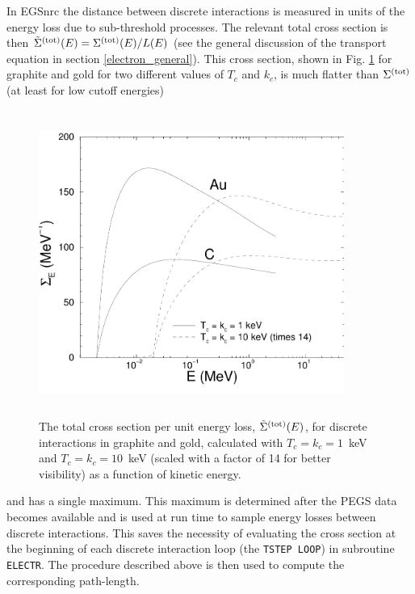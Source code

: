 In EGSnrc the distance between discrete interactions is measured 
in units of the energy loss due to sub-threshold processes. 
The relevant total cross section is then 
$\tilde{\Sigma}^{\rm (tot)}(E) = \Sigma^{\rm (tot)}(E)/L(E)$ 
(see the general discussion 
of the transport equation in section \ref{electron_general}).
This cross section, shown in Fig. \ref{tilde_sigma} for graphite and gold 
for two different values of $T_c$ and $k_c$, 
is much flatter than $\Sigma^{\rm (tot)}$ 
(at least for low cutoff energies) 
\begin{figure}[htp]
\includegraphics[height=10cm,width=10cm]{figures/cse_all}
\caption[Total cross sections per unit energy loss]{\label{tilde_sigma}
The total cross section
per unit energy loss, $\tilde{\Sigma}^{\rm (tot)}(E)$, for
discrete interactions in graphite and gold, calculated with
$T_c = k_c = 1$~keV and $T_c = k_c = 10$~keV
(scaled with a factor of 14 for better visibility)
as a function of kinetic energy.}
\end{figure}
and has a single maximum. This maximum is determined after 
the PEGS data becomes available and is used at run time to 
sample energy losses between discrete interactions.  
This saves the necessity of evaluating the cross section 
at the beginning of each discrete interaction loop 
(the {\tt TSTEP LOOP}) in subroutine {\tt ELECTR}. 
The procedure described above
is then used to compute the corresponding path-length. 
\newpage
